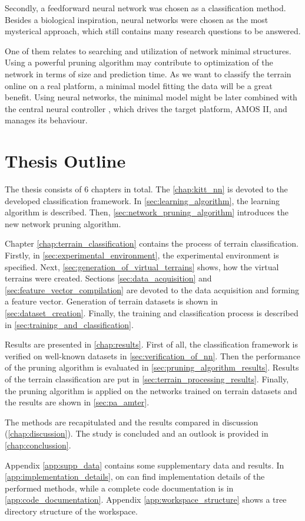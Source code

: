 Secondly, a feedforward neural network was chosen as a classification method. Besides a biological inspiration, neural networks were chosen as the most mysterical approach, which still contains many research questions to be answered. 

One of them relates to searching and utilization of network minimal structures. Using a powerful pruning algorithm may contribute to optimization of the network in terms of size and prediction time. As we want to classify the terrain online on a real platform, a minimal model fitting the data will be a great benefit. Using neural networks, the minimal model might be later combined with the central neural controller \citep{misc:amosii}, which drives the target platform, AMOS II, and manages its behaviour.

\section{Thesis Outline}
The thesis consists of 6 chapters in total. The \cref{chap:kitt_nn} is devoted to the developed classification framework. In \cref{sec:learning_algorithm}, the learning algorithm is described. Then, \cref{sec:network_pruning_algorithm} introduces the new network pruning algorithm.

Chapter \ref{chap:terrain_classification} contains the process of terrain classification. Firstly, in \cref{sec:experimental_environment}, the experimental environment is specified. Next, \cref{sec:generation_of_virtual_terrains} shows, how the virtual terrains were created. Sections \ref{sec:data_acquisition} and \ref{sec:feature_vector_compilation} are devoted to the data acquisition and forming a feature vector. Generation of terrain datasets is shown in \cref{sec:dataset_creation}. Finally, the training and classification process is described in \cref{sec:training_and_classification}.

Results are presented in \cref{chap:results}. First of all, the classification framework is verified on well-known datasets in \cref{sec:verification_of_nn}. Then the performance of the pruning algorithm is evaluated in \cref{sec:pruning_algorithm_results}. Results of the terrain classification are put in \cref{sec:terrain_processing_results}. Finally, the pruning algorithm is applied on the networks trained on terrain datasets and the results are shown in \cref{sec:pa_amter}.

The methods are recapitulated and the results compared in discussion (\cref{chap:discussion}). The study is concluded and an outlook is provided in \cref{chap:conclussion}.

Appendix \ref{app:supp_data} contains some supplementary data and results. In \cref{app:implementation_details}, on can find implementation details of the performed methods, while a complete code documentation is in \cref{app:code_documentation}. Appendix \ref{app:workspace_structure} shows a tree directory structure of the workspace.

